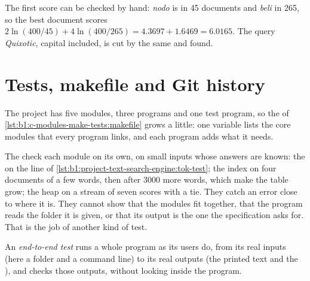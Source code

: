 \label{out:b1:project-text-search-engine:queries}

The first score can be checked by hand: \emph{nodo} is in 45 documents and \emph{beli} in 265, so the best document
scores $2 \ln(400/45) + 4 \ln(400/265) = 4.3697 + 1.6469 = 6.0165$. The query \emph{Quixotic}, capital included, is cut
by the same  and found.

\section{Tests, makefile and Git history}\label{sec:b1:project-text-search-engine:tests}

The project has five modules, three programs and one test program, so the  of
\cref{lst:b1:c-modules-make-tests:makefile} grows a little: one variable lists the core modules that every program
links, and each program adds what it needs.

\label{lst:b1:project-text-search-engine:makefile}

\label{out:b1:project-text-search-engine:make}

The  check each module on its own, on small inputs whose answers are known: the  on the line of
\cref{lst:b1:project-text-search-engine:tok-test}; the index on four documents of a few words, then after 3000 more
words, which make the table grow; the heap on a stream of seven scores with a tie. They catch an error close to where
it is. They cannot show that the modules fit together, that the program reads the folder it is given, or that its
output is the one the specification asks for. That is the job of another kind of test.

\begin{definition}\label{def:b1:project-text-search-engine:end-to-end}
An \emph{end-to-end test} runs a whole program as its users do, from its real inputs (here a
folder and a command line) to its real outputs (the printed text and the ), and checks those outputs,
without looking inside the program.
\end{definition}

